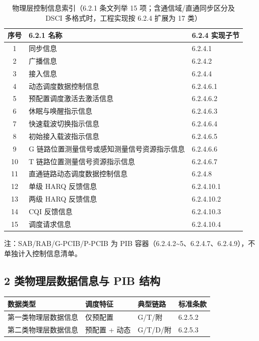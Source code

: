 \documentclass[11pt,a4paper]{ctexart}
\begin{document}
\begin{table}[h]
\centering
\small
\begin{tabular}{cll}
\toprule
\textbf{序号} & \textbf{6.2.1 名称} & \textbf{6.2.4 实现子节} \\
\midrule
1 & 同步信息 & 6.2.4.1 \\
2 & 广播信息 & 6.2.4.2 \\
3 & 接入信息 & 6.2.4.4 \\
4 & 动态调度数据控制信息 & 6.2.4.6.1 \\
5 & 预配置调度激活去激活信息 & 6.2.4.6.2 \\
6 & 休眠与唤醒指示信息 & 6.2.4.6.3 \\
7 & 快速载波切换指示信息 & 6.2.4.6.4 \\
8 & 初始接入载波指示信息 & 6.2.4.6.5 \\
9 & G 链路位置测量信号或感知测量信号资源指示信息 & 6.2.4.6.6 \\
10 & T 链路位置测量信号资源指示信息 & 6.2.4.6.7 \\
11 & 直通链路动态调度数据控制信息 & 6.2.4.8 \\
12 & 单级 HARQ 反馈信息 & 6.2.4.10.1 \\
13 & 两级 HARQ 反馈信息 & 6.2.4.10.2 \\
14 & CQI 反馈信息 & 6.2.4.10.3 \\
15 & 调度请求信息 & 6.2.4.10.4 \\
\bottomrule
\end{tabular}
\caption{物理层控制信息索引（6.2.1 条文列举 15 项；含通信域/直通同步区分及 DSCI 多格式时，工程实现按 6.2.4 扩展为 17 类）}
\end{table}
\small 注：SAB/RAB/G-PCIB/P-PCIB 为 PIB 容器（6.2.4.2\textasciitilde 5、6.2.4.7、6.2.4.9），不单独计入控制信息清单。

\subsection{2 类物理层数据信息与 PIB 结构}

\begin{table}[h]
\centering
\small
\begin{tabular}{llll}
\toprule
\textbf{数据类型} & \textbf{调度特征} & \textbf{典型链路} & \textbf{标准条款} \\
\midrule
第一类物理层数据信息 & 仅预配置 & G/T/附 & 6.2.5.2 \\
第二类物理层数据信息 & 预配置 + 动态 & G/T/D/附 & 6.2.5.3 \\
\bottomrule
\end{tabular}
\end{table}
\end{document}
